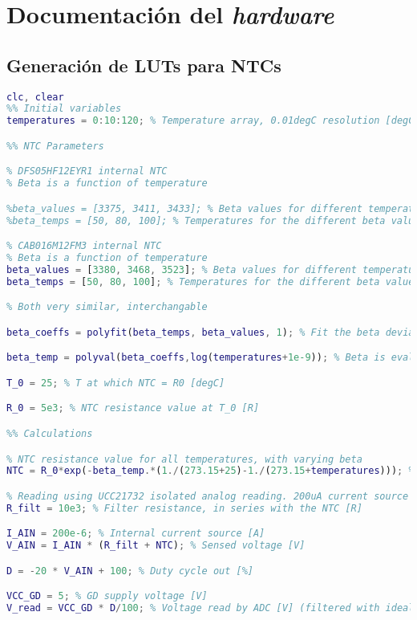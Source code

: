 \chapter{Documentación del \textit{hardware}}
\section{Generación de LUTs para NTCs}
\begin{lstlisting}[language=Matlab, basicstyle=\ttfamily\small, breaklines=true, frame=single]
%% Temperature sensing LUT calculation for DFS05HF12EYR1
clc, clear
%% Initial variables
temperatures = 0:10:120; % Temperature array, 0.01degC resolution [degC]

%% NTC Parameters

% DFS05HF12EYR1 internal NTC
% Beta is a function of temperature

%beta_values = [3375, 3411, 3433]; % Beta values for different temperatures [K]
%beta_temps = [50, 80, 100]; % Temperatures for the different beta values [degC]

% CAB016M12FM3 internal NTC
% Beta is a function of temperature
beta_values = [3380, 3468, 3523]; % Beta values for different temperatures [K]
beta_temps = [50, 80, 100]; % Temperatures for the different beta values [degC]

% Both very similar, interchangable

beta_coeffs = polyfit(beta_temps, beta_values, 1); % Fit the beta deviation with linear regression

beta_temp = polyval(beta_coeffs,log(temperatures+1e-9)); % Beta is evaluated for all temperatures, avoiding 0degC [K]

T_0 = 25; % T at which NTC = R0 [degC]

R_0 = 5e3; % NTC resistance value at T_0 [R]

%% Calculations

% NTC resistance value for all temperatures, with varying beta
NTC = R_0*exp(-beta_temp.*(1./(273.15+25)-1./(273.15+temperatures))); % NTC resistance with no errors [R]

% Reading using UCC21732 isolated analog reading. 200uA current source 
R_filt = 10e3; % Filter resistance, in series with the NTC [R]

I_AIN = 200e-6; % Internal current source [A]
V_AIN = I_AIN * (R_filt + NTC); % Sensed voltage [V]

D = -20 * V_AIN + 100; % Duty cycle out [%]

VCC_GD = 5; % GD supply voltage [V]
V_read = VCC_GD * D/100; % Voltage read by ADC [V] (filtered with ideal RC)


\end{lstlisting}
